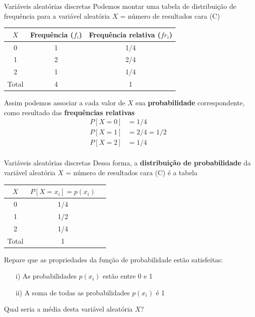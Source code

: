 \documentclass[10pt]{beamer}\usepackage[]{graphicx}\usepackage[]{color}
\theoremstyle{definition}
\begin{document}
\begin{frame}[fragile=singleslide]{Variáveis aleatórias discretas}
  Podemos montar uma tabela de distribuição de frequência para a
  variável aleatória $X$ = número de resultados cara (C)
  \begin{table}[h]
    \centering
    \begin{tabular}{ccc}
      \hline
      $X$ & Frequência ($f_i$) & Frequência relativa ($fr_i$) \\
      \hline
      0 & 1 & 1/4 \\
      1 & 2 & 2/4\\
      2 & 1 & 1/4\\
      \hline
      Total & 4 & 1 \\
      \hline
    \end{tabular}
  \end{table}
  Assim podemos associar a cada valor de $X$ sua \textbf{probabilidade}
  correspondente, como resultado das \textbf{frequências relativas}
  \begin{align*}
    P[X=0] &= 1/4 \\
    P[X=1] &= 2/4 = 1/2 \\
    P[X=2] &= 1/4 \\
  \end{align*}
\end{frame}

\begin{frame}[fragile]{Variáveis aleatórias discretas}
  Dessa forma, a \textbf{distribuição de probabilidade} da variável
  aleatória $X$ = número de resultados cara (C) é a tabela
  \begin{table}[h]
    \centering
    \begin{tabular}{ccc}
      \hline
      $X$ & $P[X = x_i] = p(x_i)$ \\
      \hline
      0 & 1/4 \\
      1 & 1/2\\
      2 & 1/4\\
      \hline
      Total & 1 \\
      \hline
    \end{tabular}
  \end{table}
  Repare que as propriedades da função de probabilidade estão
  satisfeitas:
  \begin{itemize}
  \item[i)] As probabilidades $p(x_i)$ estão entre 0 e 1
  \item[ii)] A soma de todas as probabilidades $p(x_i)$ é 1
  \end{itemize}
  \vspace{1em}
  \pause
  Qual seria a média desta variável aleatória $X$?
\end{frame}
\end{document}
